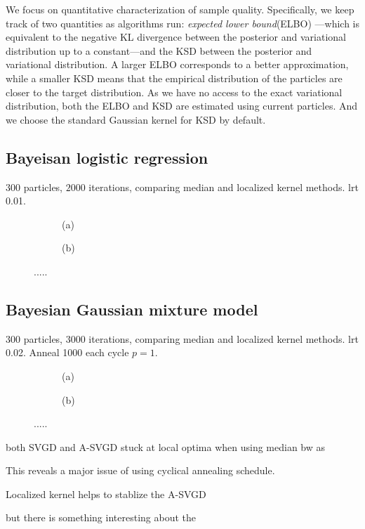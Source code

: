 We focus on quantitative characterization of sample quality. Specifically, we
keep track of two quantities as algorithms run: \emph{expected lower
bound}(ELBO) \citet{blei2017variational}---which is equivalent to the
negative KL divergence between the posterior and variational distribution up
to a constant---and the KSD between the posterior and variational
distribution. A larger ELBO corresponds to a better approximation, while a
smaller KSD means that the empirical distribution of the particles are closer
to the target distribution. As we have no access to the exact variational
distribution, both the ELBO and KSD are estimated using current particles.
And we choose the standard Gaussian kernel for KSD by default.


\subsection{Bayeisan logistic regression}






$300$ particles, $2000$ iterations, comparing median and localized kernel methods. lrt 0.01.

\captionsetup[subfigure]{labelformat=empty}
\begin{figure}[t!]
    \centering 
\begin{subfigure}[b]{.48\textwidth} 
    \caption{(a)   \label{fig:logiselbo}}
\end{subfigure}
\hfill
\centering
\begin{subfigure}[b]{0.48\textwidth}
    \caption{(b)  \label{fig:logisksd}}
\end{subfigure}

\caption{.....}
\label{fig:logistic_reg}
\end{figure}




\subsection{Bayesian Gaussian mixture model}
$300$ particles, $3000$ iterations, comparing median and localized kernel methods. lrt 0.02. Anneal 1000 each cycle  $p =1$.

\captionsetup[subfigure]{labelformat=empty}
\begin{figure}[t!]
    \centering 
\begin{subfigure}[b]{.48\textwidth} 
    \caption{(a)   \label{fig:gmmelbo}}
\end{subfigure}
\hfill
\centering
\begin{subfigure}[b]{0.48\textwidth}
    \caption{(b)  \label{fig:gmmksd}}
\end{subfigure}

\caption{.....}
\label{fig:GMM}
\end{figure}

both SVGD and A-SVGD stuck at local optima when using median bw as 

This reveals a major issue of using cyclical annealing schedule.

Localized kernel helps to stablize the A-SVGD

but there is something interesting about the 